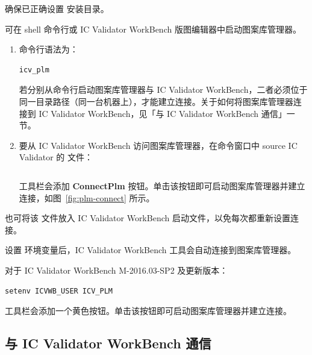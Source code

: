 确保已正确设置  安装目录。

可在 shell 命令行或 IC Validator WorkBench 版图编辑器中启动图案库管理器。

\begin{enumerate}
  \item 命令行语法为：
\begin{lstlisting}[style=shell]
icv_plm
\end{lstlisting}

\begin{noteBox}
若分别从命令行启动图案库管理器与 IC Validator WorkBench，二者必须位于同一目录路径（同一台机器上），才能建立连接。关于如何将图案库管理器连接到 IC Validator WorkBench，见「与 IC Validator WorkBench 通信」一节。
\end{noteBox}

  \item 要从 IC Validator WorkBench 访问图案库管理器，在命令窗口中 source IC Validator 的  文件：
\begin{lstlisting}[style=shell]
% source $env(ICV_INSTALL_DIRECTORY)/contrib/plm_button.tcl
\end{lstlisting}

  工具栏会添加 \textbf{ConnectPlm} 按钮。单击该按钮即可启动图案库管理器并建立连接，如图~\ref{fig:plm-connect} 所示。
\end{enumerate}


\begin{noteBox}
也可将该  文件放入 IC Validator WorkBench 启动文件，以免每次都重新设置连接。
\end{noteBox}

设置  环境变量后，IC Validator WorkBench 工具会自动连接到图案库管理器。

对于 IC Validator WorkBench M-2016.03-SP2 及更新版本：
\begin{lstlisting}[style=shell]
setenv ICVWB_USER ICV_PLM
\end{lstlisting}

工具栏会添加一个黄色按钮。单击该按钮即可启动图案库管理器并建立连接。


\subsection{与 IC Validator WorkBench 通信}
